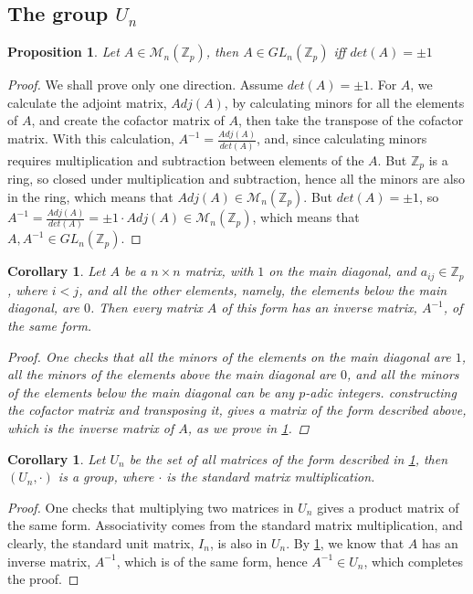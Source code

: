 \documentclass[12pt]{article}
\newtheorem{proposition}[theorem]{Proposition}
\newtheorem{corollary}[theorem]{Corollary}
\begin{document}
\subsection{The group $U_n$}
\begin{proposition}
\label{prop.integer.matrix.inverse}
Let $A\in\mathcal{M}_n(\mathbb{Z}_p)$, then $A\in GL_n(\mathbb{Z}_p)$ iff $det(A)=\pm 1$
\end{proposition}
\begin{proof}
We shall prove only one direction. Assume $det(A)=\pm 1$. 
For $A$, we calculate the adjoint matrix, $Adj(A)$, by calculating minors for all the elements of $A$, and create the cofactor matrix of $A$, then take the transpose of the cofactor matrix. With this calculation, $A^{-1}=\frac{Adj(A)}{det(A)}$, and, since calculating minors requires multiplication and subtraction between elements of the $A$. But $\mathbb{Z}_p$ is a ring, so closed under multiplication and subtraction, hence all the minors are also in the ring, which means that $Adj(A)\in\mathcal{M}_n(\mathbb{Z}_p)$. But $det(A)=\pm 1$, so $A^{-1}=\frac{Adj(A)}{det(A)}=\pm 1\cdot Adj(A)\in\mathcal{M}_n(\mathbb{Z}_p)$, which means that $A,A^{-1}\in GL_n(\mathbb{Z}_p)$.
\end{proof}
\begin{corollary}    
\label{cor.unipotent.matrix.inverse}
Let $A$ be a $n\times n$ matrix, with $1$ on the main diagonal, and $a_{ij}\in\mathbb{Z}_p$, where $i<j$, and all the other elements, namely, the elements below the main diagonal, are $0$. Then every matrix $A$ of this form has an inverse matrix, $A^{-1}$, of the same form.
\begin{proof}
One checks that all the minors of the elements on the main diagonal are $1$, all the minors of the elements above the main diagonal are $0$, and all the minors of the elements below the main diagonal can be any $p$-adic integers. constructing the cofactor matrix and transposing it, gives a matrix of the form described above, which is the inverse matrix of $A$, as we prove in \ref{prop.integer.matrix.inverse}.
\end{proof}
\end{corollary}
\begin{corollary}
\label{cor.un.group}
Let $U_n$ be the set of all matrices of the form described in \ref{cor.unipotent.matrix.inverse}, then $(U_n, \cdot)$ is a group, where $\cdot$ is the standard matrix multiplication.
\end{corollary}
\begin{proof}
One checks that multiplying two matrices in $U_n$ gives a product matrix of the same form. Associativity comes from the standard matrix multiplication, and clearly, the standard unit matrix, $I_n$, is also in $U_n$. By \ref{cor.unipotent.matrix.inverse}, we know that $A$ has an inverse matrix, $A^{-1}$, which is of the same form, hence $A^{-1}\in U_n$, which completes the proof.
\end{proof}
\end{document}
